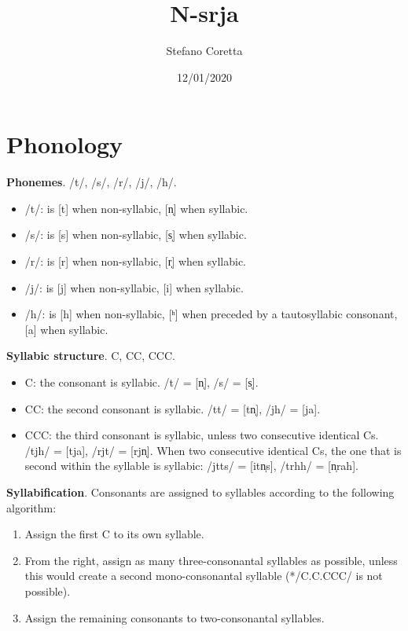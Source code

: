 \documentclass[
  a4paper,
]{article}
\title{N-srja}
\author{Stefano Coretta}
\date{12/01/2020}
\providecommand{\tightlist}{%
  \setlength{\itemsep}{0pt}\setlength{\parskip}{0pt}}
\begin{document}
\maketitle

\hypertarget{phonology}{%
\section{Phonology}\label{phonology}}

\textbf{Phonemes}. /t/, /s/, /r/, /j/, /h/.

\begin{itemize}
\tightlist
\item
  /t/: is {[}t{]} when non-syllabic, {[}n̩{]} when syllabic.
\item
  /s/: is {[}s{]} when non-syllabic, {[}s̩{]} when syllabic.
\item
  /r/: is {[}r{]} when non-syllabic, {[}r̩{]} when syllabic.
\item
  /j/: is {[}j{]} when non-syllabic, {[}i{]} when syllabic.
\item
  /h/: is {[}h{]} when non-syllabic, {[}ʰ{]} when preceded by a
  tautosyllabic consonant, {[}a{]} when syllabic.
\end{itemize}

\textbf{Syllabic structure}. C, CC, CCC.

\begin{itemize}
\tightlist
\item
  C: the consonant is syllabic. /t/ = {[}n̩{]}, /s/ = {[}s̩{]}.
\item
  CC: the second consonant is syllabic. /tt/ = {[}tn̩{]}, /jh/ =
  {[}ja{]}.
\item
  CCC: the third consonant is syllabic, unless two consecutive identical
  Cs. /tjh/ = {[}tja{]}, /rjt/ = {[}rjn̩{]}. When two consecutive
  identical Cs, the one that is second within the syllable is syllabic:
  /jtts/ = {[}itn̩s{]}, /trhh/ = {[}n̩rah{]}.
\end{itemize}

\textbf{Syllabification}. Consonants are assigned to syllables according
to the following algorithm:

\begin{enumerate}
\def\labelenumi{\arabic{enumi}.}
\tightlist
\item
  Assign the first C to its own syllable.
\item
  From the right, assign as many three-consonantal syllables as
  possible, unless this would create a second mono-consonantal syllable
  (*/C.C.CCC/ is not possible).
\item
  Assign the remaining consonants to two-consonantal syllables.
\end{enumerate}
\end{document}
